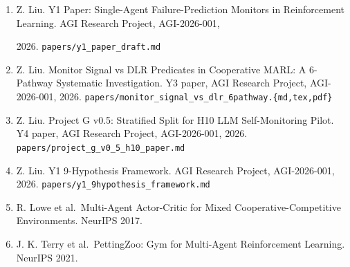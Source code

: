 \documentclass[
]{article}
\providecommand{\tightlist}{%
  \setlength{\itemsep}{0pt}\setlength{\parskip}{0pt}}
\begin{document}
\begin{enumerate}
\def\labelenumi{\arabic{enumi}.}
\tightlist
\item
  Z. Liu. Y1 Paper: Single-Agent Failure-Prediction Monitors in
  Reinforcement Learning. AGI Research Project, AGI-2026-001,

  2026. \texttt{papers/y1\_paper\_draft.md}
\item
  Z. Liu. Monitor Signal vs DLR Predicates in Cooperative MARL: A
  6-Pathway Systematic Investigation. Y3 paper, AGI Research Project,
  AGI-2026-001, 2026.
  \texttt{papers/monitor\_signal\_vs\_dlr\_6pathway.\{md,tex,pdf\}}
\item
  Z. Liu. Project G v0.5: Stratified Split for H10 LLM Self-Monitoring
  Pilot. Y4 paper, AGI Research Project, AGI-2026-001, 2026.
  \texttt{papers/project\_g\_v0\_5\_h10\_paper.md}
\item
  Z. Liu. Y1 9-Hypothesis Framework. AGI Research Project, AGI-2026-001,
  2026. \texttt{papers/y1\_9hypothesis\_framework.md}
\item
  R. Lowe et al.~Multi-Agent Actor-Critic for Mixed
  Cooperative-Competitive Environments. NeurIPS 2017.
\item
  J. K. Terry et al.~PettingZoo: Gym for Multi-Agent Reinforcement
  Learning. NeurIPS 2021.
\end{enumerate}
\end{document}
